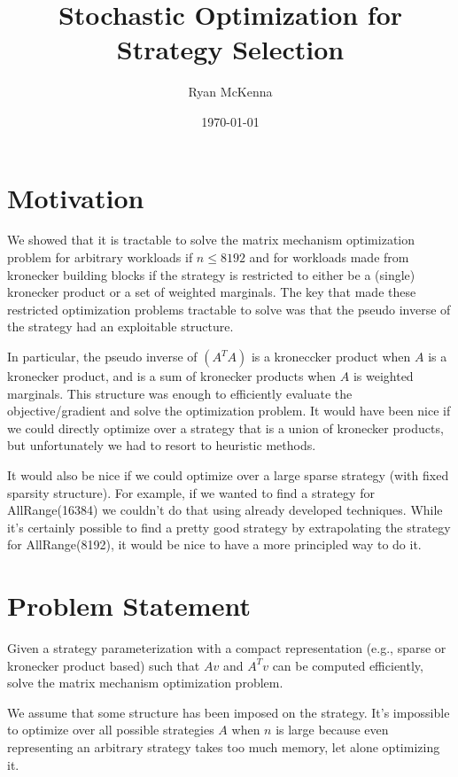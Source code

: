 \documentclass[12]{article}
\begin{document}
\title{Stochastic Optimization for Strategy Selection}
\author{Ryan McKenna}
\date{\today}
\maketitle

\section{Motivation}

We showed that it is tractable to solve the matrix mechanism optimization problem for arbitrary workloads if $ n \leq 8192 $ and for workloads made from kronecker building blocks if the strategy is restricted to either be a (single) kronecker product or a set of weighted marginals.  The key that made these restricted optimization problems tractable to solve was that the pseudo inverse of the strategy had an exploitable structure.

In particular, the pseudo inverse of $(A^T A)$ is a kroneccker product when $A$ is a kronecker product, and is a sum of kronecker products when $A$ is weighted marginals.  This structure was enough to efficiently evaluate the objective/gradient and solve the optimization problem.  It would have been nice if we could directly optimize over a strategy that is a union of kronecker products, but unfortunately we had to resort to heuristic methods.

It would also be nice if we could optimize over a large sparse strategy (with fixed sparsity structure).  For example, if we wanted to find a strategy for AllRange(16384) we couldn't do that using already developed techniques.  While it's certainly possible to find a pretty good strategy by extrapolating the strategy for AllRange(8192), it would be nice to have a more principled way to do it.  

\section{Problem Statement}

Given a strategy parameterization with a compact representation (e.g., sparse or kronecker product based) such that $Av$ and $A^T v$ can be computed efficiently, solve the matrix mechanism optimization problem.  

We assume that some structure has been imposed on the strategy.  It's impossible to optimize over all possible strategies $A$ when $n$ is large because even representing an arbitrary strategy takes too much memory, let alone optimizing it.  
\end{document}
